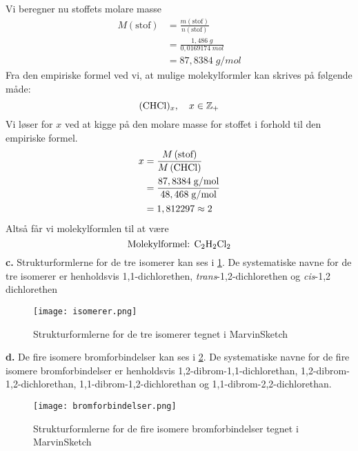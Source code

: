 \documentclass{report}
\begin{document}
Vi beregner nu stoffets molare masse
\begin{equation*}
\begin{split}
  M(\text{stof} )&=\frac{m(\text{stof} )}{n(\text{stof} )}\\ 
  &=\frac{1,486 \;\unit{g} }{0,0169174 \;\unit{mol} }\\ 
  &=87,8384 \;\unit{g/mol} 
\end{split}
\end{equation*}
Fra den empiriske formel ved vi, at mulige molekylformler kan skrives på følgende måde:
\[
\ce{(CHCl)_x}, \quad x \in \mathbb{Z}_+
\] 
Vi løser for $x$ ved at kigge på den molare masse for stoffet i forhold til den empiriske formel. 
\begin{equation*}
\begin{split}
  x&=\frac{M \left(\text{stof} \right) }{M \left(\ce{CHCl} \right) }\\ 
  &=\frac{87,8384 \;\unit{g/mol} }{48,468 \;\unit{g/mol} }\\ 
  &=1,812297 \approx 2
\end{split}
\end{equation*}
Altså får vi molekylformlen til at være
\[
\text{Molekylformel: } \ce{C2H2Cl2}  
\] 
\textbf{c.}
Strukturformlerne for de tre isomerer kan ses i \cref{fig:isomerer}. 
De systematiske navne for de tre isomerer er henholdsvis 1,1-dichlorethen, \textit{trans}-1,2-dichlorethen og \textit{cis}-1,2 dichlorethen
\begin{figure}[H]
\begin{center}
  \texttt{[image: isomerer.png]}
\end{center}
\caption{Strukturformlerne for de tre isomerer tegnet i MarvinSketch}
\label{fig:isomerer}
\end{figure}
\noindent \textbf{d.}
De fire isomere bromforbindelser kan ses i \cref{fig:bromforbindelser}.
De systematiske navne for de fire isomere bromforbindelser er henholdsvis 1,2-dibrom-1,1-dichlorethan, 1,2-dibrom-1,2-dichlorethan, 1,1-dibrom-1,2-dichlorethan og 1,1-dibrom-2,2-dichlorethan.
\begin{figure}[H]
\begin{center}
  \texttt{[image: bromforbindelser.png]}
\end{center}
\caption{Strukturformlerne for de fire isomere bromforbindelser tegnet i MarvinSketch}
\label{fig:bromforbindelser}
\end{figure}
\end{document}
